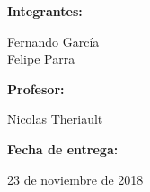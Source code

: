 \begin{titlepage}
        \begin{minipage}[l]{0.4\textwidth}
            \begin{flushleft}
            \linespread{1}
            \end{flushleft}
        \end{minipage}
        \begin{minipage}[l]{0.6\textwidth}
            \begin{flushright}
                \begin{flushleft}
                \large \textbf{\hspace{130pt}Integrantes: } 
                \end{flushleft}
                Fernando García\\Felipe Parra\\
                \begin{flushleft}
                \large \textbf{\hspace{130pt}Profesor: }
                \end{flushleft}
                Nicolas Theriault
                \begin{flushleft}
                \large \textbf{\hspace{130pt}Fecha de entrega: }
                \end{flushleft}
                23 de noviembre de 2018
            \end{flushright}
        \end{minipage}
	\end{titlepage}
	
    \clearpage 
    \setcounter{page}{0}
    \setcounter{page}{1}
    \tableofcontents \thispagestyle{myheadings}
    \clearpage
    \setcounter{page}{0}
    \setcounter{page}{1}
